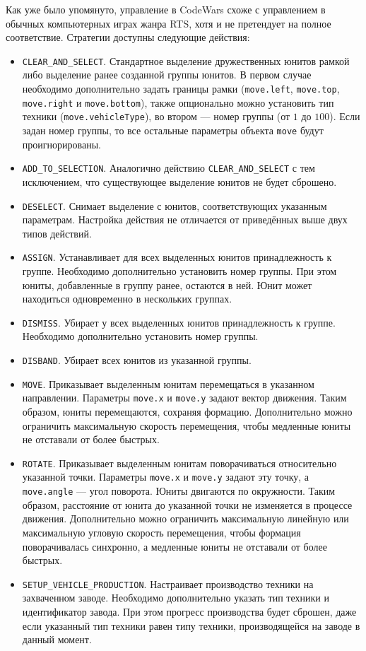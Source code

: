 Как уже было упомянуто, управление в CodeWars схоже с управлением в обычных компьютерных играх жанра RTS, хотя и не претендует на полное
соответствие. Стратегии доступны следующие действия:
\begin{itemize}
    \item \texttt{CLEAR\_AND\_SELECT}. Стандартное выделение дружественных юнитов рамкой либо выделение ранее созданной группы юнитов. В
          первом случае необходимо дополнительно задать границы рамки (\texttt{move.left}, \texttt{move.top}, \texttt{move.right} и
          \texttt{move.bottom}), также опционально можно установить тип техники (\texttt{move.vehicleType}), во втором --- номер группы (от
          $1$ до $100$). Если задан номер группы, то все остальные параметры объекта \texttt{move} будут проигнорированы.
    \item \texttt{ADD\_TO\_SELECTION}. Аналогично действию \texttt{CLEAR\_AND\_SELECT} с тем исключением, что существующее выделение юнитов
          не будет сброшено.
    \item \texttt{DESELECT}. Снимает выделение с юнитов, соответствующих указанным параметрам. Настройка действия не отличается от
          приведённых выше двух типов действий.
    \item \texttt{ASSIGN}. Устанавливает для всех выделенных юнитов принадлежность к группе. Необходимо дополнительно установить номер
          группы. При этом юниты, добавленные в группу ранее, остаются в ней. Юнит может находиться одновременно в нескольких группах.
    \item \texttt{DISMISS}. Убирает у всех выделенных юнитов принадлежность к группе. Необходимо дополнительно установить номер группы.
    \item \texttt{DISBAND}. Убирает всех юнитов из указанной группы.
    \item \texttt{MOVE}. Приказывает выделенным юнитам перемещаться в указанном направлении. Параметры \texttt{move.x} и \texttt{move.y}
          задают вектор движения. Таким образом, юниты перемещаются, сохраняя формацию. Дополнительно можно ограничить максимальную скорость
          перемещения, чтобы медленные юниты не отставали от более быстрых.
    \item \texttt{ROTATE}. Приказывает выделенным юнитам поворачиваться относительно указанной точки. Параметры \texttt{move.x} и
          \texttt{move.y} задают эту точку, а \texttt{move.angle} --- угол поворота. Юниты двигаются по окружности. Таким образом,
          расстояние от юнита до указанной точки не изменяется в процессе движения. Дополнительно можно ограничить максимальную линейную или
          максимальную угловую скорость перемещения, чтобы формация поворачивалась синхронно, а медленные юниты не отставали от более
          быстрых.
    \item \texttt{SETUP\_VEHICLE\_PRODUCTION}. Настраивает производство техники на захваченном заводе. Необходимо дополнительно указать тип
          техники и идентификатор завода. При этом прогресс производства будет сброшен, даже если указанный тип техники равен типу техники,
          производящейся на заводе в данный момент.
\end{itemize}

